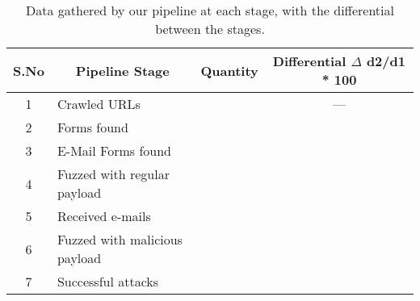 \begin{table}[!htbp]
	\centering
	\begin{tabular}{|c|l|c|c|}
		\hline
		\multicolumn{1}{|c|}{\textbf{S.No}} &
		\multicolumn{1}{c|}{\textbf{Pipeline Stage}} &
		\multicolumn{1}{p{3cm}|}{\centering \textbf{Quantity}} &
		\multicolumn{1}{p{2.8cm}|}{\centering \textbf{Differential}
		$\Delta$ d2/d1 * 100}\\
		\hline
		1 &  Crawled URLs  & \urls &  --- \\
		\hline
		2 &  Forms found  & \forms & \formsDelta \\
		\hline
		3 &  E-Mail Forms found  & \emailforms & \emailformsDelta \\
		\hline
		4 &  Fuzzed with regular payload  & \fuzzed & \fuzzedDelta \\
		\hline
		5 &  Received e-mails  & \recd & \recdDelta \\
		\hline
		6 &  Fuzzed with malicious payload  & \malfuzzed & \malfuzzedDelta \\
		\hline
		7 &  Successful attacks  & \success & \successDelta \\
		\hline

	\end{tabular}
	\caption[Data gathered by our pipeline]{Data gathered by our pipeline at each stage, with the differential between the stages.}
	\label{tab:pipeline}
\end{table}